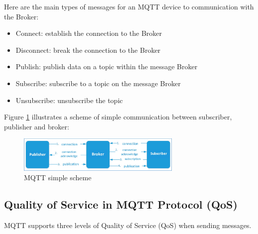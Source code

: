 \documentclass[\main/main.tex]{subfiles}
\begin{document}
Here are the main types of messages for an MQTT device to communication with the Broker:

\begin{itemize}
    \item Connect: establish the connection to the Broker
    \item Disconnect: break the connection to the Broker
    \item Publish: publish data on a topic within the message Broker
    \item Subscribe: subscribe to a topic on the message Broker
    \item Unsubscribe: unsubscribe the topic
\end{itemize}


Figure \ref{fig:mqtt_schema} illustrates a scheme of simple communication between subscriber, publisher and broker: 
\begin{figure}[H]
    \begin{center}
        \includegraphics[width=0.7\textwidth]{mqtt_schema.jpg}
    \end{center}
    \caption{MQTT simple scheme}
    \label{fig:mqtt_schema}
\end{figure}

\subsection{Quality of Service in MQTT Protocol (QoS)}

MQTT supports three levels of Quality of Service (QoS) when sending messages.
\end{document}

